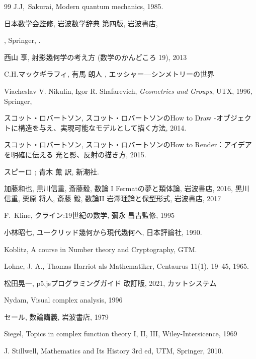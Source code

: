\documentclass[book, paper=a4paper, 12pt]{jlreq}
\theoremstyle{definition}
\theoremstyle{remark}
\begin{document}
\begin{thebibliography}{99}
 J.J,~Sakurai, Modern quantum mechanics, 1985.

日本数学会監修, 
\newblock 岩波数学辞典 第四版, 
\newblock 岩波書店, 

,
\newblock Springer, 
.

西山 享, 射影幾何学の考え方 (数学のかんどころ 19), 2013 


C.H.マックギラフィ, 有馬 朗人 , エッシャー—シンメトリーの世界


Viacheslav V. Nikulin, Igor R. Shafarevich, \textit{Geometries and Groups}, UTX, 1996, Springer, 

         スコット・ロバートソン, 
         スコット・ロバートソンのHow to Draw -オブジェクトに構造を与え、実現可能なモデルとして描く方法, 
         2014.
         
         スコット・ロバートソン, 
         スコット・ロバートソンのHow to Render：アイデアを明確に伝える 光と影、反射の描き方, 2015.

スピーロ ; 青木 薫 訳,
\newblock  新潮社.

   加藤和也, 黒川信重, 斎藤毅, 数論 I Fermatの夢と類体論, 岩波書店, 2016, 
   黒川 信重, 栗原 将人, 斎藤 毅, 数論II 岩澤理論と保型形式, 岩波書店,  2017
   

F.~Kline, クライン:19世紀の数学, 彌永 昌吉監修, 1995

    小林昭七, ユークリッド幾何から現代幾何へ, 日本評論社, 1990.

    Koblitz, A course in Number theory and Cryptography, GTM.
   
Lohne, J. A., Thomas Harriot als Mathematiker, Centaurus 11(1), 19--45, 1965.

      松田晃一, p5.jsプログラミングガイド  改訂版, 2021, カットシステム
  
   Nydam, Visual complex analysis, 1996

   セール, 数論講義, 岩波書店, 1979
 
    Siegel, Topics in complex function theory I, II, III, 
   Wiley-Intersicence, 1969

J.  Stillwell, Mathematics and Its History  3rd ed, UTM, Springer, 2010.


\end{thebibliography}
\end{document}

